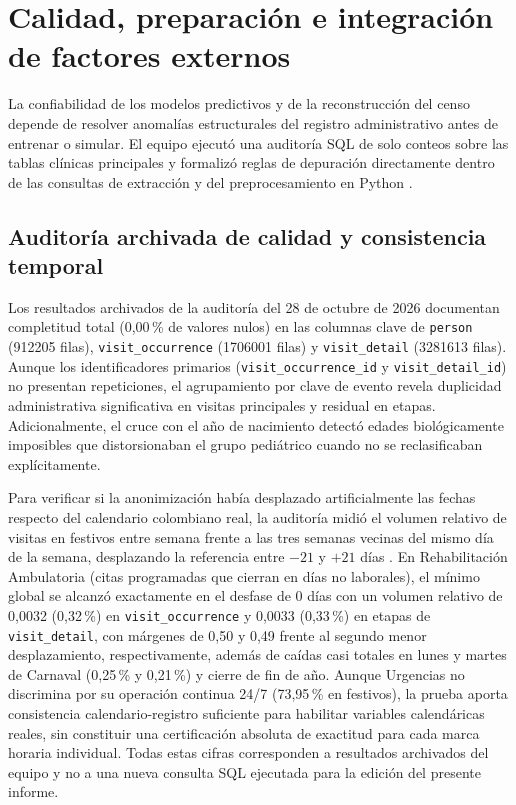 
\section{Calidad, preparación e integración de factores externos}

La confiabilidad de los modelos predictivos y de la reconstrucción del censo depende de resolver anomalías estructurales del registro administrativo antes de entrenar o simular. El equipo ejecutó una auditoría SQL de solo conteos sobre las tablas clínicas principales y formalizó reglas de depuración directamente dentro de las consultas de extracción y del preprocesamiento en Python \parencite{mediflow2026calidad,mediflow2026informe}.

\subsection{Auditoría archivada de calidad y consistencia temporal}

Los resultados archivados de la auditoría del 28 de octubre de 2026 \parencite{mediflow2026calidad} documentan completitud total (0,00\,\% de valores nulos) en las columnas clave de \texttt{person} (\num{912205} filas), \texttt{visit\_occurrence} (\num{1706001} filas) y \texttt{visit\_detail} (\num{3281613} filas). Aunque los identificadores primarios (\texttt{visit\_occurrence\_id} y \texttt{visit\_detail\_id}) no presentan repeticiones, el agrupamiento por clave de evento revela duplicidad administrativa significativa en visitas principales y residual en etapas. Adicionalmente, el cruce con el año de nacimiento detectó edades biológicamente imposibles que distorsionaban el grupo pediátrico cuando no se reclasificaban explícitamente.

Para verificar si la anonimización había desplazado artificialmente las fechas respecto del calendario colombiano real, la auditoría midió el volumen relativo de visitas en festivos entre semana frente a las tres semanas vecinas del mismo día de la semana, desplazando la referencia entre $-21$ y $+21$ días \parencite{mediflow2026calidad}. En Rehabilitación Ambulatoria (citas programadas que cierran en días no laborales), el mínimo global se alcanzó exactamente en el desfase de 0 días con un volumen relativo de 0,0032 (0,32\,\%) en \texttt{visit\_occurrence} y 0,0033 (0,33\,\%) en etapas de \texttt{visit\_detail}, con márgenes de 0,50 y 0,49 frente al segundo menor desplazamiento, respectivamente, además de caídas casi totales en lunes y martes de Carnaval (0,25\,\% y 0,21\,\%) y cierre de fin de año. Aunque Urgencias no discrimina por su operación continua 24/7 (73,95\,\% en festivos), la prueba aporta consistencia calendario-registro suficiente para habilitar variables calendáricas reales, sin constituir una certificación absoluta de exactitud para cada marca horaria individual. Todas estas cifras corresponden a resultados archivados del equipo y no a una nueva consulta SQL ejecutada para la edición del presente informe.

